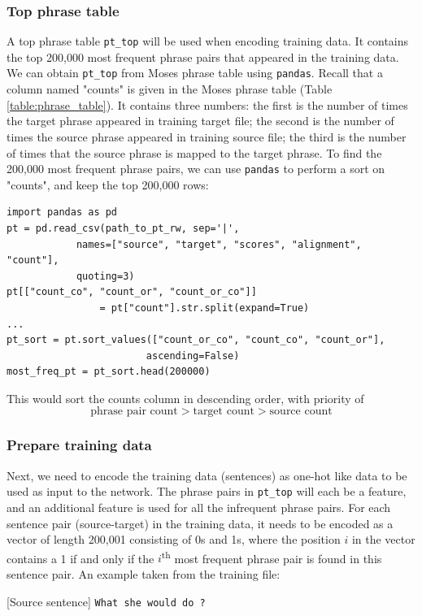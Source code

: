 \documentclass[12pt,a4paper,twoside,openright]{report}
\begin{document}
\subsubsection{Top phrase table}
A top phrase table \texttt{pt\_top} will be used when encoding training data. It contains the top 200,000 most frequent phrase pairs that appeared in the training data. We can obtain \texttt{pt\_top} from Moses phrase table using \texttt{pandas}. Recall that a column named "counts" is given in the Moses phrase table (Table \ref{table:phrase_table}). It contains three numbers: the first is the number of times the target phrase appeared in training target file; the second is the number of times the source phrase appeared in training source file; the third is the number of times that the source phrase is mapped to the target phrase. To find the 200,000 most frequent phrase pairs, we can use \texttt{pandas} to perform a sort on "counts", and keep the top 200,000 rows:

\begin{verbatim}
import pandas as pd
pt = pd.read_csv(path_to_pt_rw, sep='|', 
            names=["source", "target", "scores", "alignment", "count"], 
            quoting=3)
pt[["count_co", "count_or", "count_or_co"]] 
                = pt["count"].str.split(expand=True)
...
pt_sort = pt.sort_values(["count_or_co", "count_co", "count_or"], 
                        ascending=False)
most_freq_pt = pt_sort.head(200000)
\end{verbatim}

This would sort the counts column in descending order, with priority of
\[\textrm{phrase pair count} > \textrm{target count} > \textrm{source count}\]

\subsubsection{Prepare training data}
Next, we need to encode the training data (sentences) as one-hot like data to be used as input to the network. The phrase pairs in \texttt{pt\_top} will each be a feature, and an additional feature is used for all the infrequent phrase pairs. For each sentence pair (source-target) in the training data, it needs to be encoded as a vector of length 200,001 consisting of 0s and 1s, where the position $i$ in the vector contains a 1 if and only if the $i$\textsuperscript{th} most frequent phrase pair is found in this sentence pair. An example taken from the training file:

[Source sentence]
\texttt{What she would do ?}
\end{document}

